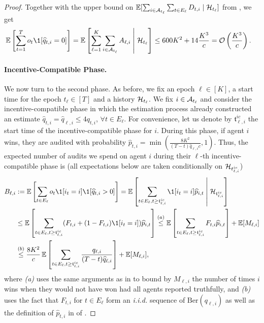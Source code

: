 \begin{proof}
Together with the upper bound on $\E[\sum_{i\in \mA_{t_\ell}} \sum_{t\in E_\ell} D_{t,i}\mid \mH_{t_\ell}]$ from , we get
\begin{align*}
\E\sqb{\sum_{t=1}^T o_t \1[\hat q_{t,i}=0] }=\E\sqb{\sum_{\ell=1}^K \sum_{i\in\mA_{t_\ell}} A_{\ell,i} \middle \vert \mH_{t_\ell}}&\leq 600K^2 + 14\frac{K^3}{c}=\O\paren{\frac{K^3}{c}}.
\end{align*}

\paragraph{Incentive-Compatible Phase.} We now turn to the second phase. As before, we fix an epoch $\ell\in[K]$, a start time for the epoch $t_\ell\in[T]$ and a history $\mathcal{H}_{t_\ell}$. We fix $i\in\mathcal{A}_{t_\ell}$ and consider the incentive-compatible phase in which the estimation process already constructed an estimate $\hat q_{t,i}=\hat q_{\ell,i}\leq 4q_{t,i}$, $\forall t\in E_\ell$. For convenience, let us denote by ${\mathfrak t}_{\ell,i}^{ic}$ the start time of the incentive-compatible phase for $i$. During this phase, if agent $i$ wins, they are audited with probability $\hat p_{t,i}=\min(\frac{8K^2}{(T-t)\hat q_{\ell,i}c},1)$. Thus, the expected number of audits we spend on agent $i$ during their $\ell$-th incentive-compatible phase is (all expectations below are taken conditionally on $\mathcal{H}_{t_{\ell,i}^{ic}}$)
\begin{align*}
B_{\ell,i}&:=\E\sqb{\sum_{t\in E_\ell}o_t \1[i_t=i] \1[\hat q_{t,i}>0] } = \E\sqb{\sum_{t\in E_\ell,t\geq {\mathfrak t}_{\ell,i}^{ic}}\1[i_t=i] \hat p_{i,t} \middle \vert \mH_{{\mathfrak t}_{\ell,i}^{ic}}}\\
&\leq \E\sqb{\sum_{t\in E_\ell,t\geq {\mathfrak t}_{\ell,i}^{ic}}(F_{t,i} + (1-F_{t,i})\1[i_t=i]) \hat p_{i,t} }\overset{(a)}{\leq} \E\sqb{\sum_{t\in E_\ell,t\geq {\mathfrak t}_{\ell,i}^{ic}}F_{t,i}\hat p_{i,t} } + \E[M_{\ell,i} ]\\
&\overset{(b)}{\leq } \frac{8K^2 }{c}\E\sqb{\sum_{t\in E_\ell,t\geq {\mathfrak t}_{\ell,i}^{ic}}\frac{q_{\ell,i}}{(T-t)\hat q_{\ell,i}} } + \E[M_{\ell,i} ],
\end{align*}
where \textit{(a)} uses the same arguments as in  to bound by $M_{\ell,i}$ the number of times $i$ wins when they would not have won had all agents reported truthfully, and \textit{(b)} uses the fact that $F_{t,i}$ for $t\in E_\ell$ form an \textit{i.i.d.} sequence of $\text{Ber}(q_{\ell,i})$ as well as the definition of $\hat p_{t,i}$ in  of . 


\end{proof}

